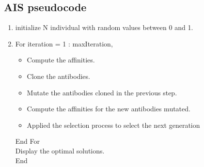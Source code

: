 \documentclass[]{interact}
\theoremstyle{plain}%
\theoremstyle{definition}
\theoremstyle{remark}
\begin{document}
\subsection{AIS pseudocode}
\begin{enumerate}
\item initialize N individual with random values between 0 and 1.
\item For iteration = 1 : maxIteration,
\begin{itemize}
\item Compute the affinities.
\item Clone the antibodies.
\item Mutate the antibodies cloned in the previous step.
\item Compute the affinities for the new antibodies mutated.
\item Applied the selection process to select the next generation
\end{itemize} 
End For \\
Display the optimal solutions. \\
End
\end{enumerate}
\end{document}
